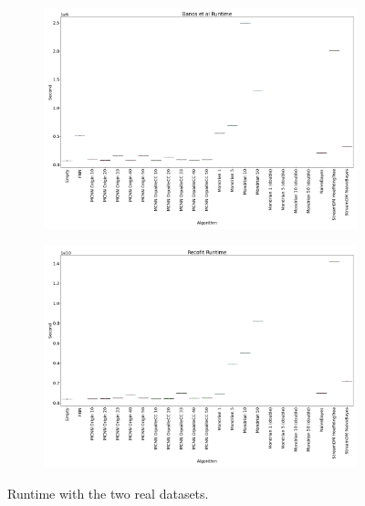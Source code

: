 \begin{figure}
	\begin{subfigure}[t]{.49\linewidth}
		\includegraphics[width=\linewidth]{figures/results/banos_3_runtime.png}
		\caption{\banosdataset}
		\label{fig:runtime-banos}
	\end{subfigure}
	\hfill
	\begin{subfigure}[t]{.49\linewidth}
		\includegraphics[width=\linewidth]{figures/results/recofit_3_runtime.png}
		\caption{\recofitdataset}
		\label{fig:runtime-recofit}
	\end{subfigure}
	\caption{Runtime with the two real datasets. }
	\label{fig:runtime}
\end{figure}


